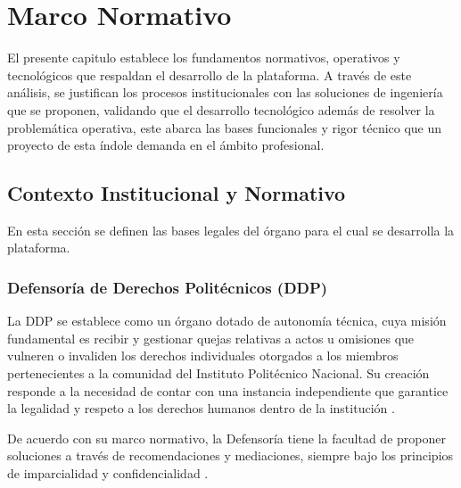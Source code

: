 
\chapter{Marco Normativo}
El presente capitulo establece los fundamentos normativos, operativos y tecnológicos que respaldan el desarrollo de la plataforma. A través de este análisis, se justifican los procesos institucionales con las soluciones de ingeniería que se proponen, validando que el desarrollo tecnológico además de resolver la problemática operativa, este abarca las bases funcionales y rigor técnico que un proyecto de esta índole demanda en el ámbito profesional.
\begin{flushleft}
\section{Contexto Institucional y Normativo}
\end{flushleft}
\justifying
En esta sección se definen las bases legales del órgano para el cual se desarrolla la plataforma.

\subsection{Defensoría de Derechos Politécnicos (DDP)}
La DDP se establece como un órgano dotado de autonomía técnica, cuya misión fundamental es recibir y gestionar quejas relativas a actos u omisiones que vulneren o invaliden los derechos individuales otorgados a los miembros pertenecientes a la comunidad del Instituto Politécnico Nacional. Su creación responde a la necesidad de contar con una instancia independiente que garantice la legalidad y respeto a los derechos humanos dentro de la institución \cite{3} .

De acuerdo con su marco normativo, la Defensoría tiene la facultad de proponer soluciones a través de recomendaciones y mediaciones, siempre bajo los principios de imparcialidad y confidencialidad \cite{3} .

